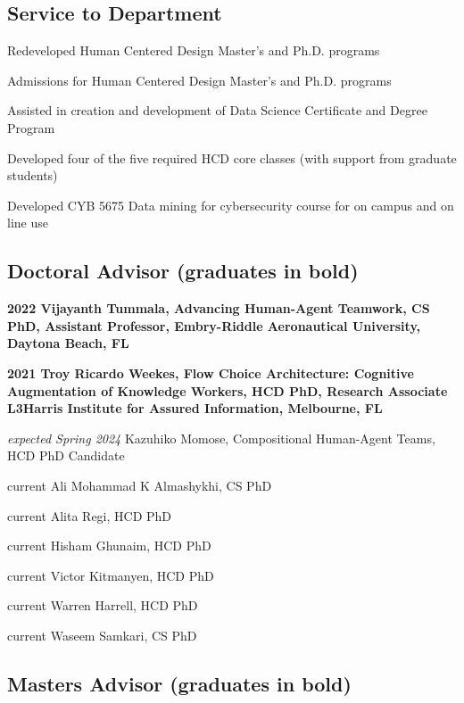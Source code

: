 \documentclass[12pt,letterpaper]{report}
\newcommand{\listitemspace}{0.25em}
\renewenvironment{itemize}
{\begin{list}{}{\setlength{\leftmargin}{0em}
                \setlength{\parskip}{0em}
                \setlength{\itemsep}{\listitemspace}
                \setlength{\parsep}{\listitemspace}}}
{\end{list}}
\begin{document}
    \subsection*{Service to Department}

    \begin{itemize}
        \item Redeveloped Human Centered Design Master's and Ph.D. programs
        \item Admissions for Human Centered Design Master's and Ph.D. programs
        \item Assisted in creation and development of Data Science Certificate and Degree Program
        \item Developed four of the five required HCD core classes (with support from graduate students)
        \item Developed CYB 5675  Data mining for cybersecurity course for on campus and on line use
    \end{itemize}

    \subsection*{Doctoral Advisor (graduates in bold)}

    \begin{itemize}
        \item \textbf{2022 Vijayanth Tummala, Advancing Human-Agent Teamwork, CS PhD, Assistant Professor, Embry-Riddle Aeronautical University, Daytona Beach, FL}
        \item \textbf{2021 Troy Ricardo Weekes, Flow Choice Architecture: Cognitive Augmentation of Knowledge Workers, HCD PhD, Research Associate L3Harris Institute for Assured Information, Melbourne, FL}
        \item \textit{expected Spring 2024} Kazuhiko Momose, Compositional Human-Agent Teams, HCD PhD Candidate
        \item current Ali Mohammad K Almashykhi, CS PhD
        \item current Alita Regi, HCD PhD
        \item current Hisham Ghunaim, HCD PhD
        \item current Victor Kitmanyen, HCD PhD
        \item current Warren Harrell, HCD PhD
        \item current Waseem Samkari, CS PhD
    \end{itemize}

    \subsection*{Masters Advisor (graduates in bold)}
\end{document}
